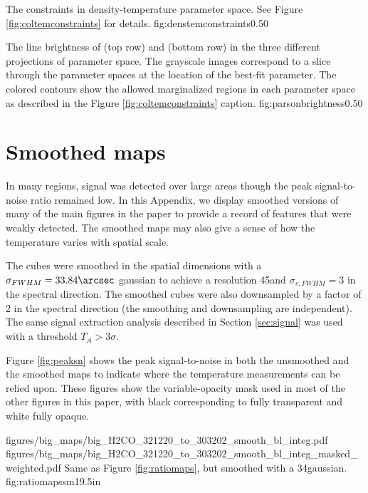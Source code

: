 {The constraints in density-temperature parameter space.
See Figure \ref{fig:coltemconstraints} for details.}
{fig:denstemconstraints}{0.5}{0}

{The line brightness of \para \threeohthree (top row) and \para \threetwoone
(bottom row) in the three different projections of parameter space.  The
grayscale images correspond to a slice through the parameter spaces at the
location of the best-fit parameter.  The colored contours show the allowed
marginalized regions in each parameter space as described in the
Figure \ref{fig:coltemconstraints} caption.}
{fig:parsonbrightness}{0.5}{0}

\section{Smoothed maps}
\label{appendix:smoothed}
In many regions, signal was detected over large areas though the peak
signal-to-noise ratio remained low.  In this Appendix, we display smoothed
versions of many of the main figures in the paper to provide a record of
features that were weakly detected.  The smoothed maps may also give a sense
of how the temperature varies with spatial scale.

The cubes were smoothed in the spatial dimensions with a
$\sigma_{FWHM}=33.84\arcsec$ gaussian to achieve a resolution 45\arcsec and
$\sigma_{v, FWHM} = 3$ \kms in the spectral direction.  The smoothed cubes were
also downsampled by a factor of 2 in the spectral direction (the smoothing and
downsampling are independent).  
The same signal extraction analysis described in Section \ref{sec:signal} was used with a
threshold $T_A > 3\sigma$.  

Figure \ref{fig:peaksn} shows the peak signal-to-noise in both the unsmoothed
and the smoothed maps to indicate where the temperature measurements can be
relied upon.  These figures show the variable-opacity mask used in most of the
other figures in this paper, with black corresponding to fully transparent and
white fully opaque.


\RotFigureTwoAA
{figures/big_maps/big_H2CO_321220_to_303202_smooth_bl_integ.pdf}
{figures/big_maps/big_H2CO_321220_to_303202_smooth_bl_integ_masked_weighted.pdf}
{Same as Figure \ref{fig:ratiomaps}, but smoothed with a 34\arcsec gaussian.
}
{fig:ratiomapssm}{1}{9.5in}


